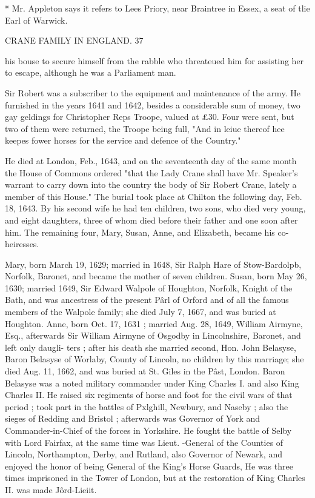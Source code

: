 * Mr. Appleton says it refers to Lees Priory, near Braintree in Essex, 
a seat of tlie Earl of Warwick. 



CRANE FAMILY IN ENGLAND. 37 

his bouse to secure himself from the rabble who threateued him 
for assisting her to escape, although he was a Parliament man. 

Sir Robert was a subscriber to the equipment and maintenance 
of the army. He furnished in the years 1641 and 1642, besides 
a considerable sum of money, two gay geldings for Christopher 
Reps Troope, valued at £30. Four were sent, but two of them 
were returned, the Troope being full, "And in leiue thereof hee 
keepes fower horses for the service and defence of the Country." 

He died at London, Feb., 1643, and on the seventeenth day of 
the same month the House of Commons ordered "that the Lady 
Crane shall have Mr. Speaker's warrant to carry down into the 
country the body of Sir Robert Crane, lately a member of this 
House." The burial took place at Chilton the following day, 
Feb. 18, 1643. By his second wife he had ten children, two 
sons, who died very young, and eight daughters, three of whom 
died before their father and one soon after him. The remaining 
four, Mary, Susan, Anne, and Elizabeth, became his co-heiresses. 

Mary, born March 19, 1629; married in 1648, Sir Ralph Hare 
of Stow-Bardolpb, Norfolk, Baronet, and became the mother of 
seven children. Susan, born May 26, 1630; married 1649, Sir 
Edward Walpole of Houghton, Norfolk, Knight of the Bath, and 
was ancestress of the present P\^arl of Orford and of all the famous 
members of the Walpole family; she died July 7, 1667, and 
was buried at Houghton. Anne, born Oct. 17, 1631 ; married 
Aug. 28, 1649, William Airmyne, Esq., afterwards Sir William 
Airmyne of Osgodby in Lincolnshire, Baronet, and left only daugli- 
ters ; after his death she married second, Hon. John Belasyse, 
Baron Belasyse of Worlaby, County of Lincoln, no children by 
this marriage; she died Aug. 11, 1662, and was buried at St. 
Giles in the P\^ast, London. Baron Belasyse was a noted military 
commander under King Charles I. and also King Charles II. 
He raised six regiments of horse and foot for the civil wars of 
that period ; took part in the battles of Pxlghill, Newbury, and 
Naseby ; also the sieges of Redding and Bristol ; afterwards was 
Governor of York and Commander-in-Chief of the forces in 
Yorkshire. He fought the battle of Selby with Lord Fairfax, at 
the same time was Lieut. -General of the Counties of Lincoln, 
Northampton, Derby, and Rutland, also Governor of Newark, 
and enjoyed the honor of being General of the King's Horse 
Guards, He was three times imprisoned in the Tower of London, 
but at the restoration of King Charles II. was made J\^ord-Lieiit. 




